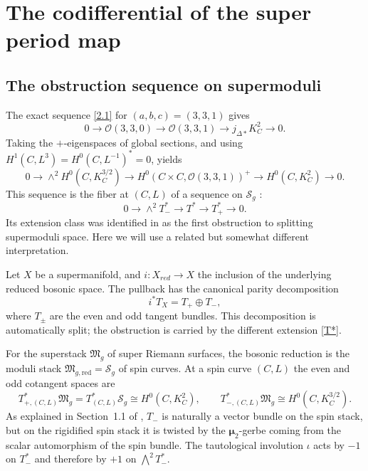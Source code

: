 \documentclass[11pt]{article}
\newcommand{\OO}{\mathcal O}
\newcommand{\FM}{\mathfrak M}
\newcommand{\SSS}{\mathcal S}
\begin{document}
\section{The codifferential of the super period map}

\subsection{The obstruction sequence on supermoduli}

The exact sequence \eqref{2.1} for $(a,b,c)=(3,3,1)$ gives
\[
{0\to \OO(3,3,0) \to \OO(3,3,1) \to j_{\Delta*}K_C^2 \to 0.}
\]
{Taking the $+$-eigenspaces of global sections, and using
$H^1(C,L^3)=H^0(C,L^{-1})^*=0$, yields}
\begin{equation} \label{obstruction}
0\to \wedge^2 H^0(C,K_C^{3/2})
\to {H^0(C\times C,\OO(3,3,1))^+}
\to H^0(C,K_C^2)\to 0.
\end{equation}
This sequence is the fiber at $(C,L)$ of a sequence on $\SSS_g$ :
\begin{equation} \label{T*}
    0\to \wedge^2 T_-^* \to T^* \to T_+^* \to 0.
\end{equation}
Its extension class was identified in {\cite[Proposition~3.1 and Theorem~3.2]{DW2}} as
the first obstruction to splitting supermoduli space.
Here we will use a related but somewhat different interpretation.

Let $X$ be a supermanifold,
and $i:X_{red} \to X$ the inclusion of the underlying reduced bosonic space.
{The pullback has the canonical parity decomposition}
\begin{equation} \label{pm}
    {i^*T_X=T_+\oplus T_-,}
\end{equation}
where $T_{\pm}$ are the even and odd tangent bundles.
{This decomposition is automatically split; the obstruction is
carried by the different extension \eqref{T*}.}

For the superstack $\FM_g$ of super Riemann surfaces, the bosonic
reduction is the moduli stack $\FM_{g,\mathrm{red}}=\SSS_g$ of spin
curves.  At a spin curve $(C,L)$ the even and odd cotangent spaces are
\[
T^*_{+,(C,L)}\FM_g
=T^*_{(C,L)}\SSS_g
\cong H^0(C,K_C^2),
\qquad
T^*_{-,(C,L)}\FM_g
\cong H^0(C,K_C^{3/2}).
\]
As explained in Section~1.1 of \cite{DW2}, $T_-$ is naturally a vector
bundle on the spin stack, but on the {rigidified spin stack} it is twisted by
the $\boldsymbol\mu_2$-gerbe coming from the scalar automorphism of the spin
bundle.  The tautological involution $\iota$ acts by $-1$ on $T_-^*$ and
therefore by $+1$ on $\bigwedge^2T_-^*$.
\end{document}
